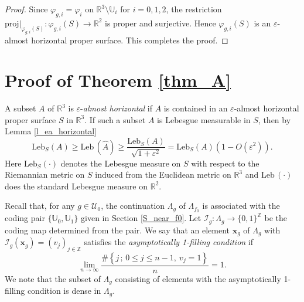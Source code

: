 \documentclass{amsart}
\theoremstyle{plain}
\theoremstyle{definition}
\theoremstyle{remark}
\numberwithin{equation}{section}
\def\uu{\mathbb{U}}
\def\bx{{\boldsymbol{x}}}
\begin{document}
\begin{proof}
Since $\varphi_{g,i}=\varphi_i$ on $\mathbb{R}^3\setminus \uu_i$ for $i=0,1,2$, 
the restriction 
$\mathrm{proj}|_{\varphi_{g,i}(S)}:\varphi_{g,i}(S)\longrightarrow \mathbb{R}^2$ is proper and surjective.
Hence $\varphi_{g,i}(S)$ is an $\varepsilon$-almost horizontal proper surface.
This completes the proof.
\end{proof}


\section{Proof of Theorem \ref{thm_A}}\label{S_proof_of_thmA}




A subset $A$ of $\mathbb{R}^3$ is $\varepsilon$-\emph{almost horizontal} if $A$ is contained in 
an $\varepsilon$-almost horizontal proper surface $S$ in $\mathbb{R}^3$.
If such a subset $A$ is Lebesgue measurable in $S$, then by Lemma \ref{l_ea_horizontal} 
\begin{equation}\label{eqn_Leb_A}
\mathrm{Leb}_S(A)\geq \mathrm{Leb}\,(\widehat A)\geq \frac{\mathrm{Leb}_S(A)}{\sqrt{1+\varepsilon^2}}
=\mathrm{Leb}_S(A)(1-O(\varepsilon^2)).
\end{equation}
Here $\mathrm{Leb}_S(\cdot)$ denotes the Lebesgue measure on $S$ with respect to 
the Riemannian metric on $S$ induced from the Euclidean metric on $\mathbb{R}^3$ 
and $\mathrm{Leb}\,(\cdot)$ does the standard Lebesgue measure on $\mathbb{R}^2$.



Recall that, for any $g\in \mathcal{U}_0$, the continuation $\Lambda_g$ of $\Lambda_{f_0}$ is associated with the coding pair $\{ \mathbb{U}_0, \mathbb{U}_1 \}$ given in Section \ref{S_near_f0}.
Let $\mathcal{I}_g: \Lambda_{g}  \longrightarrow  \{ 0,1\} ^{\mathbb Z}$ be the coding map 
determined from the pair. 
We say that an element $\bx_g$ of $\Lambda_g$ with $\mathcal{I}_g(\bx_g)=(v_j)_{j\in \mathbb{Z}}$ satisfies the \emph{asymptotically 1-filling condition} if 
\begin{equation}\label{eqn_1-filling}
\lim_{n\to \infty}\frac{\#\left\{j\,;\,0\leq j\leq n-1,\ v_j=1\right\}}{n}=1.
\end{equation}
We note that the subset of $\Lambda_g$ consisting of elements with the asymptotically 1-filling  
condition is dense in $\Lambda_g$.
\end{document}
